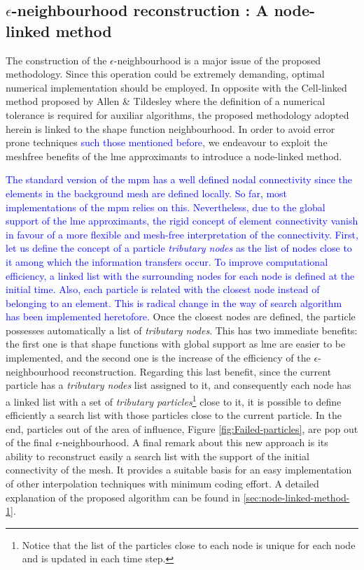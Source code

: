 \documentclass[preprint,12pt,a4paper]{elsarticle}
\begin{document}
\subsection{$\epsilon$-neighbourhood reconstruction : A node-linked method}
\label{sec:epsil-neighb-reconst}
The construction of the $\epsilon$-neighbourhood is a major issue of the proposed methodology. Since this operation could be extremely demanding, optimal
numerical implementation should be employed. In opposite with the Cell-linked
method proposed by Allen \& Tildesley \cite{Allen_et_al_1989} where
the definition of a numerical tolerance is required for auxiliar
algorithms, the proposed methodology adopted herein is linked to the shape function neighbourhood. In order to avoid error prone techniques \textcolor{blue}{such those mentioned before}, we endeavour to exploit the meshfree benefits of the \acrshort{lme} approximants to introduce a node-linked method. 

\textcolor{blue}{The standard version of the \acrshort{mpm} has a well defined nodal connectivity since the elements in the background mesh are defined locally. So far, most implementations of the \acrshort{mpm} relies on this. Nevertheless, due to the global support of the \acrshort{lme} approximants, the rigid concept of element connectivity vanish in favour of a more flexible and mesh-free interpretation of the connectivity. First, let us define the concept of a particle \textit{tributary nodes}  as the list of nodes close to it among which the information transfers occur. To improve computational efficiency, a linked list with the surrounding nodes for each node is defined at the initial time. Also, each particle is related with the closest node instead of belonging to an element. This is radical change in the way of search algorithm has been implemented heretofore.} Once the closest nodes are defined, the particle possesses automatically a list of \textit{tributary nodes}. This has two immediate benefits: the first one is that shape functions with global
support as \acrshort{lme} are easier to be implemented, and the second one is the increase of the efficiency of the $\epsilon$-neighbourhood
reconstruction. Regarding this last benefit, since the current particle has a \textit{tributary nodes} list assigned to it, and consequently each node has a linked list with a set of \textit{tributary particles}\footnote{Notice that the list of the
  particles close to each node is unique for each node and is updated in each time step.} close to it, it is possible to define efficiently a
search list with those particles close to the current particle.
In the end, particles out of the area of influence, Figure
\ref{fig:Failed-particles}, are pop out of the final
$\epsilon$-neighbourhood. A final remark about this new approach is
its ability to reconstruct easily a search list with the support of
the initial connectivity of the mesh. It provides a suitable basis for
an easy implementation of other interpolation techniques with minimum
coding effort. A detailed explanation of the proposed algorithm can be
found in \ref{sec:node-linked-method-1}.
\end{document}
